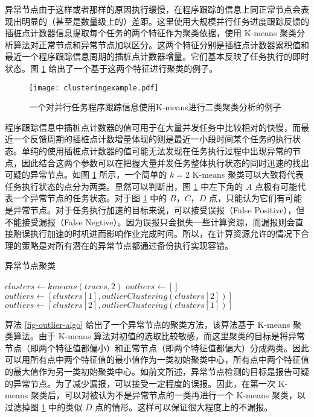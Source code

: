 异常节点由于这样或者那样的原因执行缓慢，在程序跟踪的信息上同正常节点会表现出明显的（甚至是数量级上的）差距。这里使用大规模并行任务进度跟踪反馈的插桩点计数器信息提取每个任务的两个特征作为聚类依据，使用 K-means 聚类分析算法对正常节点和异常节点加以区分。这两个特征分别是插桩点计数器累积值和最近一个程序跟踪信息周期的插桩点计数器增量。它们基本反映了任务执行的即时状态。图 \ref{figure:clusteringexample} 给出了一个基于这两个特征进行聚类的例子。
\begin{figure}
  \centering
  \texttt{[image: clusteringexample.pdf]}
  \caption{一个对并行任务程序跟踪信息使用K-means进行二类聚类分析的例子}
  \label{figure:clusteringexample}
\end{figure}

程序跟踪信息中插桩点计数器的值可用于在大量并发任务中比较相对的快慢，而最近一个反馈周期的插桩点计数增量体现的则是最近一小段时间某个任务的执行状态。单纯的使用插桩点计数器的值可能无法发现在任务执行过程中出现异常的节点，因此结合这两个参数可以在把握大量并发任务整体执行状态的同时迅速的找出可疑的异常节点。如图 \ref{figure:clusteringexample} 所示，一个简单的 $k = 2$ K-means 聚类可以大致将代表任务执行状态的点分为两类。显然可以判断出，图 \ref{figure:clusteringexample} 中左下角的 $A$ 点极有可能代表一个异常节点的任务状态。对于图 \ref{figure:clusteringexample} 中的 $B$，$C$，$D$ 点，只能认为它们有可能是异常节点。对于任务执行加速的目标来说，可以接受误报（False Positive），但不能接受漏报（False Negtive）。因为误报只会损失一些计算资源，而漏报则会直接贻误执行加速的时机进而影响作业完成时间。所以，在计算资源允许的情况下合理的策略是对所有潜在的异常节点都通过备份执行实现容错。

\begin{algorithm}
\caption{异常节点聚类}
\label{fig-outlier-algo}
%
$clusters\gets kmeans(traces, 2)$\;
$outliers\gets[]$\;
{
  {
    $outliers\gets [clusters[1], outlierClustering(clusters[2])]$
  }
  {
    $outliers\gets [clusters[2], outlierClustering(clusters[1])]$
  }
}
\end{algorithm}

算法 \ref{fig-outlier-algo} 给出了一个异常节点的聚类方法，该算法基于 K-means 聚类算法。由于 K-means 算法对初值的选取比较敏感，而这里聚类的目标是将异常节点（即两个特征值都偏小）和正常节点（即两个特征值都偏大）分成两类。因此可以用所有点中两个特征值的最小值作为一类初始聚类中心，所有点中两个特征值的最大值作为另一类初始聚类中心。如前文所述，异常节点检测的目标是报告可疑的异常节点。为了减少漏报，可以接受一定程度的误报。因此，在第一次 K-means 聚类后，可以对被认为不是异常节点的一类再进行一个 K-means 聚类，以过滤掉图 \ref{figure:clusteringexample} 中的类似 $D$ 点的情形。这样可以保证很大程度上的不漏报。

